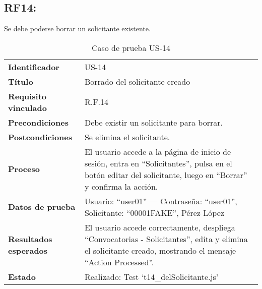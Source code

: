 \subsection*{RF14:} Se debe poderse borrar un solicitante existente.
\begin{table}[H]
	\centering
	\small
	\caption{Caso de prueba US-14}
	\label{tab:caso_uso14}
	\begin{tabular}{>{\bfseries}l p{11cm}}
		Identificador & US-14 \\
		Título & Borrado del solicitante creado \\
		Requisito vinculado & R.F.14 \\
		Precondiciones & Debe existir un solicitante para borrar. \\
		Postcondiciones & Se elimina el solicitante. \\
		Proceso & El usuario accede a la página de inicio de sesión, entra en “Solicitantes”, pulsa en el botón editar del solicitante, luego en “Borrar” y confirma la acción. \\
		Datos de prueba & Usuario: “user01” — Contraseña: “user01”, Solicitante: “00001FAKE”, Pérez López \\
		Resultados esperados & El usuario accede correctamente, despliega “Convocatorias - Solicitantes”, edita y elimina el solicitante creado, mostrando el mensaje “Action Processed”. \\
		Estado & Realizado: Test `t14\_delSolicitante.js' \\
	\end{tabular}
\end{table}


